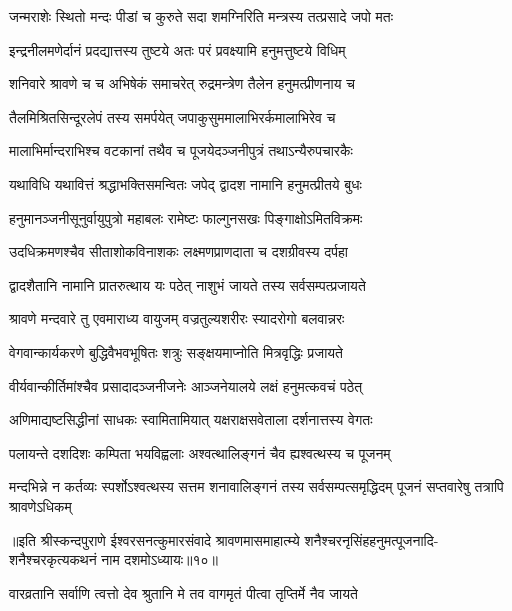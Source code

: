 \twolineshloka
{जन्मराशेः स्थितो मन्दः पीडां च कुरुते सदा}
{शमग्निरिति मन्त्रस्य तत्प्रसादे जपो मतः} %

\twolineshloka
{इन्द्रनीलमणेर्दानं प्रदद्यात्तस्य तुष्टये}
{अतः परं प्रवक्ष्यामि हनुमत्तुष्टये विधिम्} %

\twolineshloka
{शनिवारे श्रावणे च च अभिषेकं समाचरेत्}
{रुद्रमन्त्रेण तैलेन हनुमत्प्रीणनाय च} %

\twolineshloka
{तैलमिश्रितसिन्दूरलेपं तस्य समर्पयेत्}
{जपाकुसुममालाभिरर्कमालाभिरेव च} %

\twolineshloka
{मालाभिर्मान्दराभिश्च वटकानां तथैव च}
{पूजयेदञ्जनीपुत्रं तथाऽन्यैरुपचारकैः} %

\twolineshloka
{यथाविधि यथावित्तं श्रद्धाभक्तिसमन्वितः}
{जपेद् द्वादश नामानि हनुमत्प्रीतये बुधः} %

\twolineshloka
{हनुमानञ्जनीसूनुर्वायुपुत्रो महाबलः}
{रामेष्टः फाल्गुनसखः पिङ्गाक्षोऽमितविक्रमः} %

\twolineshloka
{उदधिक्रमणश्चैव सीताशोकविनाशकः}
{लक्ष्मणप्राणदाता च दशग्रीवस्य दर्पहा} %

\twolineshloka
{द्वादशैतानि नामानि प्रातरुत्थाय यः पठेत्}
{नाशुभं जायते तस्य सर्वसम्पत्प्रजायते} %

\twolineshloka
{श्रावणे मन्दवारे तु एवमाराध्य वायुजम्}
{वज्रतुल्यशरीरः स्यादरोगो बलवान्नरः} %

\twolineshloka
{वेगवान्कार्यकरणे बुद्धिवैभवभूषितः}
{शत्रुः सङ्क्षयमाप्नोति मित्रवृद्धिः प्रजायते} %

\twolineshloka
{वीर्यवान्कीर्तिमांश्चैव प्रसादादञ्जनीजनेः}
{आञ्जनेयालये लक्षं हनुमत्कवचं पठेत्} %

\twolineshloka
{अणिमाद्यष्टसिद्धीनां साधकः स्वामितामियात्}
{यक्षराक्षसवेताला दर्शनात्तस्य वेगतः} %

\twolineshloka
{पलायन्ते दशदिशः कम्पिता भयविह्वलाः}
{अश्वत्थालिङ्गनं चैव ह्यश्वत्थस्य च पूजनम्} %


\threelineshloka
{मन्दभिन्ने न कर्तव्यः स्पर्शोऽश्वत्थस्य सत्तम}
{शनावालिङ्गनं तस्य सर्वसम्पत्समृद्धिदम्}
{पूजनं सप्तवारेषु तत्रापि श्रावणेऽधिकम्} %


{॥इति श्रीस्कन्दपुराणे ईश्वरसनत्कुमारसंवादे श्रावणमासमाहात्म्ये शनैश्चरनृसिंहहनुमत्पूजनादि-शनैश्चरकृत्यकथनं नाम दशमोऽध्यायः॥१०॥}





\twolineshloka
{वारव्रतानि सर्वाणि त्वत्तो देव श्रुतानि मे}
{तव वागमृतं पीत्वा तृप्तिर्मे नैव जायते} %

